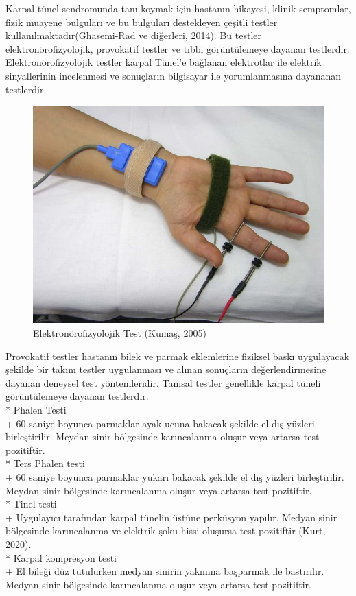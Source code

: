 \documentclass[12pt,twoside]{deuthesis}
\begin{document}
Karpal tünel sendromunda tanı koymak için hastanın hikayesi, klinik semptomlar, fizik muayene bulguları ve bu bulguları destekleyen çeşitli testler kullanılmaktadır(Ghasemi-Rad ve diğerleri, 2014).
Bu testler elektronörofizyolojik, provokatif testler ve tıbbi görüntülemeye dayanan testlerdir.
Elektronörofizyolojik testler karpal Tünel'e bağlanan elektrotlar ile elektrik sinyallerinin incelenmesi ve sonuçların bilgisayar ile yorumlanmasına dayananan testlerdir.

\begin{figure}

{\centering \includegraphics[width=0.49\linewidth,height=0.18\textheight]{figure/noropati_test} 

}

\caption{Elektronörofizyolojik Test (Kumaş, 2005)}\label{fig:unnamed-chunk-2}
\end{figure}
Provokatif testler hastanın bilek ve parmak eklemlerine fiziksel baskı uygulayacak şekilde bir takım
testler uygulanması ve alınan sonuçların değerlendirmesine dayanan deneysel test yöntemleridir.
Tanısal testler genellikle karpal tüneli görüntülemeye dayanan testlerdir.\\
* Phalen Testi\\
+ 60 saniye boyunca parmaklar ayak ucuna bakacak şekilde el dış yüzleri birleştirilir. Meydan sinir bölgesinde karıncalanma oluşur veya artarsa test pozitiftir.\\
* Ters Phalen testi\\
+ 60 saniye boyunca parmaklar yukarı bakacak şekilde el dış yüzleri birleştirilir. Meydan sinir bölgesinde karıncalanma oluşur veya artarsa test pozitiftir.\\
* Tinel testi\\
+ Uygulayıcı tarafından karpal tünelin üstüne perküsyon yapılır. Medyan sinir bölgesinde karıncalanma ve elektrik şoku hissi oluşursa test pozitiftir (Kurt, 2020).\\
* Karpal kompresyon testi\\
+ El bileği düz tutulurken medyan sinirin yakınına başparmak ile bastırılır. Medyan sinir bölgesinde karıncalanma oluşur veya artarsa test pozitiftir.\\
\end{document}
